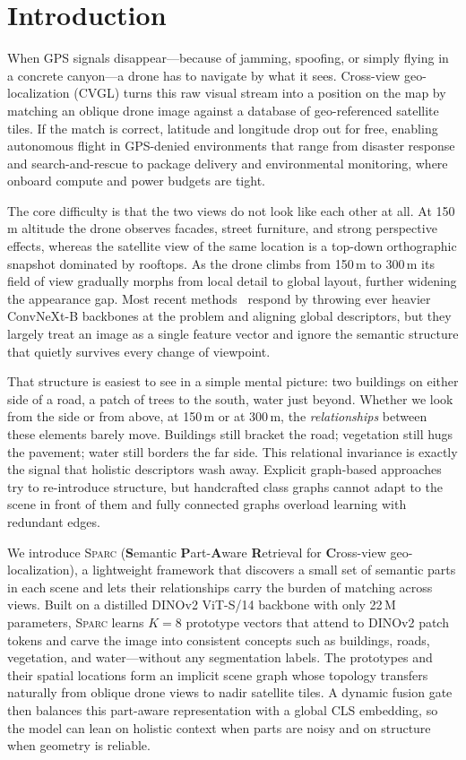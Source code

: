 \documentclass[sigconf, anonymous, review]{acmart}
\newcommand{\ours}{\textsc{Sparc}}
\begin{document}
\section{Introduction}
\label{sec:intro}

When GPS signals disappear---because of jamming, spoofing, or simply flying in a concrete canyon---a drone has to navigate by what it sees.
Cross-view geo-localization (CVGL) turns this raw visual stream into a position on the map by matching an oblique drone image against a database of geo-referenced satellite tiles.
If the match is correct, latitude and longitude drop out for free, enabling autonomous flight in GPS-denied environments that range from disaster response and search-and-rescue to package delivery and environmental monitoring, where onboard compute and power budgets are tight.

The core difficulty is that the two views do not look like each other at all.
At 150\,m altitude the drone observes facades, street furniture, and strong perspective effects, whereas the satellite view of the same location is a top-down orthographic snapshot dominated by rooftops.
As the drone climbs from 150\,m to 300\,m its field of view gradually morphs from local detail to global layout, further widening the appearance gap.
Most recent methods~\cite{deuser2023sample4geo, yang2024camp, wang2025mcfa} respond by throwing ever heavier ConvNeXt-B backbones at the problem and aligning global descriptors, but they largely treat an image as a single feature vector and ignore the semantic structure that quietly survives every change of viewpoint.

That structure is easiest to see in a simple mental picture: two buildings on either side of a road, a patch of trees to the south, water just beyond.
Whether we look from the side or from above, at 150\,m or at 300\,m, the \emph{relationships} between these elements barely move.
Buildings still bracket the road; vegetation still hugs the pavement; water still borders the far side.
This relational invariance is exactly the signal that holistic descriptors wash away.
Explicit graph-based approaches~\cite{wang2023segcn, lin2022dwdr} try to re-introduce structure, but handcrafted class graphs cannot adapt to the scene in front of them and fully connected graphs overload learning with redundant edges.

We introduce \ours{} (\textbf{S}emantic \textbf{P}art-\textbf{A}ware \textbf{R}etrieval for \textbf{C}ross-view geo-localization), a lightweight framework that discovers a small set of semantic parts in each scene and lets their relationships carry the burden of matching across views.
Built on a distilled DINOv2 ViT-S/14 backbone with only 22\,M parameters, \ours{} learns $K{=}8$ prototype vectors that attend to DINOv2 patch tokens and carve the image into consistent concepts such as buildings, roads, vegetation, and water---without any segmentation labels.
The prototypes and their spatial locations form an implicit scene graph whose topology transfers naturally from oblique drone views to nadir satellite tiles.
A dynamic fusion gate then balances this part-aware representation with a global CLS embedding, so the model can lean on holistic context when parts are noisy and on structure when geometry is reliable.
\end{document}
